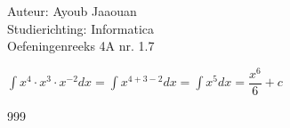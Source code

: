 \documentclass[a4paper]{article}
\begin{document}
\noindent \large Auteur: Ayoub Jaaouan \\
\noindent \large Studierichting: Informatica\\
\noindent \large Oefeningenreeks 4A nr. 1.7\\

\medskip

\normalsize

$\displaystyle\int x^4\cdot x^3 \cdot x^{-2} dx =  \displaystyle\int x^{4+3-2} dx = \displaystyle\int x^5 dx = \dfrac{x^6}{6} + c$\\


\begin{thebibliography}{999}
\end{thebibliography}
\end{document}
